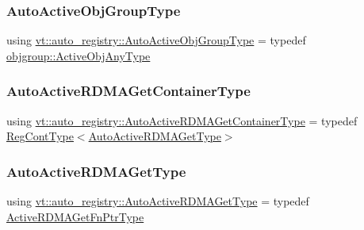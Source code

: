 \mbox{\label{namespacevt_1_1auto__registry_a861d9d01e89c81f0a955188724aa25b3}} 
\subsubsection{\texorpdfstring{Auto\+Active\+Obj\+Group\+Type}{AutoActiveObjGroupType}}
{\footnotesize\ttfamily using \hyperlink{namespacevt_1_1auto__registry_a861d9d01e89c81f0a955188724aa25b3}{vt\+::auto\+\_\+registry\+::\+Auto\+Active\+Obj\+Group\+Type} = typedef \hyperlink{namespacevt_1_1objgroup_a25bec5d3c8e8bb02b62280eec62b8ac7}{objgroup\+::\+Active\+Obj\+Any\+Type}}

\mbox{\label{namespacevt_1_1auto__registry_a85bc3ac8c35caf2f304c24a73a07f1c6}} 
\subsubsection{\texorpdfstring{Auto\+Active\+R\+D\+M\+A\+Get\+Container\+Type}{AutoActiveRDMAGetContainerType}}
{\footnotesize\ttfamily using \hyperlink{namespacevt_1_1auto__registry_a85bc3ac8c35caf2f304c24a73a07f1c6}{vt\+::auto\+\_\+registry\+::\+Auto\+Active\+R\+D\+M\+A\+Get\+Container\+Type} = typedef \hyperlink{namespacevt_1_1auto__registry_a988a4943e4c8fe82b56f5b13bddceb2b}{Reg\+Cont\+Type}$<$\hyperlink{namespacevt_1_1auto__registry_a039813f93a5804c77ae612e0318fb335}{Auto\+Active\+R\+D\+M\+A\+Get\+Type}$>$}

\mbox{\label{namespacevt_1_1auto__registry_a039813f93a5804c77ae612e0318fb335}} 
\subsubsection{\texorpdfstring{Auto\+Active\+R\+D\+M\+A\+Get\+Type}{AutoActiveRDMAGetType}}
{\footnotesize\ttfamily using \hyperlink{namespacevt_1_1auto__registry_a039813f93a5804c77ae612e0318fb335}{vt\+::auto\+\_\+registry\+::\+Auto\+Active\+R\+D\+M\+A\+Get\+Type} = typedef \hyperlink{namespacevt_ae4fbf97da623bfcd09ee8379de756257}{Active\+R\+D\+M\+A\+Get\+Fn\+Ptr\+Type}}

